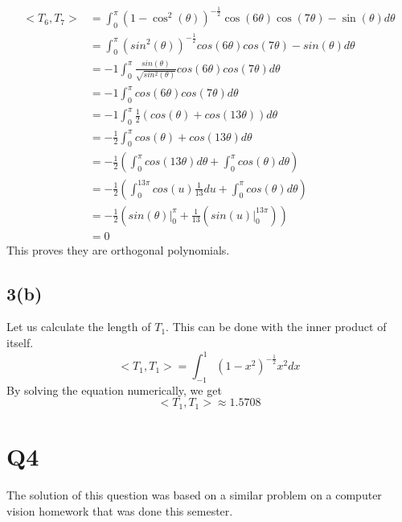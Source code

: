 \documentclass{article}
\begin{document}
\begin{equation*}
\begin{aligned}
<T_6,T_7> &= \int_0^\pi (1-\cos^2(\theta))^{-\frac{1}{2}} \cos(6\theta) \cos(7\theta)-\sin(\theta)d\theta\\
	&= \int_0^\pi (sin^2(\theta))^{-\frac{1}{2}} cos(6\theta) cos(7\theta)-sin(\theta)d\theta\\
	&= -1 \int_0^\pi \frac{sin(\theta)}{\sqrt{sin^2(\theta)}} cos(6\theta) cos(7\theta)d\theta\\
	& = -1 \int_0^\pi  cos(6\theta) cos(7\theta)d\theta\\
	& = -1 \int_0^\pi  \frac{1}{2}(cos(\theta) + cos(13\theta))d\theta\\
	& = - \frac{1}{2} \int_0^\pi  cos(\theta) + cos(13\theta)d\theta\\
	& = - \frac{1}{2} (\int_0^\pi cos(13\theta)d\theta + \int_0^\pi  cos(\theta) d\theta)\\
	& = - \frac{1}{2} (\int_0^{13\pi} cos(u)\frac{1}{13}du + \int_0^\pi  cos(\theta) d\theta)\\
	& = - \frac{1}{2}(sin(\theta)|_0^\pi + \frac{1}{13}(sin(u)|_0^{13\pi})) \\
	& = 0
\end{aligned}
\end{equation*}
This proves they are orthogonal polynomials.

\subsection*{3(b)}
Let us calculate the length of $T_1$. This can be done with the inner product of itself.
\begin{equation*}
<T_1,T_1> = \int_{-1}^1(1 -x^2)^{-\frac{1}{2}}x^2 dx
\end{equation*}
By solving the equation numerically, we get
\begin{equation*}
<T_1,T_1> \approx 1.5708
\end{equation*}

\section{Q4}
The solution of this question was based on a similar problem on a computer vision homework that was done this semester.
\end{document}
